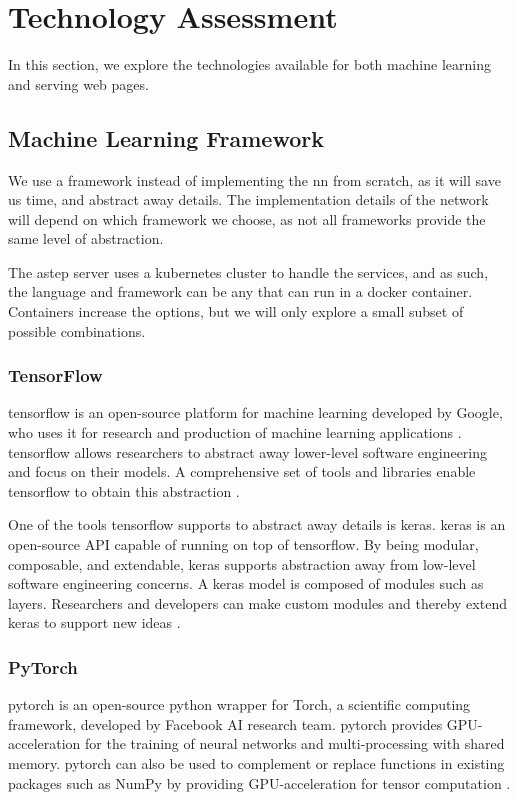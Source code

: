 \section{Technology Assessment} \label{sc:technology_assessment}
In this section, we explore the technologies available for both machine learning and serving web pages.

\subsection{Machine Learning Framework}
We use a framework instead of implementing the \gls{nn} from scratch, as it will save us time, and abstract away details. The implementation details of the network will depend on which framework we choose, as not all frameworks provide the same level of abstraction.

The \gls{astep} server uses a \gls{kubernetes} cluster to handle the services, and as such, the language and framework can be any that can run in a docker container. Containers increase the options, but we will only explore a small subset of possible combinations.

\subsubsection*{TensorFlow}
\gls{tensorflow} is an open-source platform for machine learning developed by Google, who uses it for research and production of machine learning applications \cite{GoogleTensorflowOpenSourced}. \Gls{tensorflow} allows researchers to abstract away lower-level software engineering and focus on their models. A comprehensive set of tools and libraries enable \gls{tensorflow} to obtain this abstraction \cite{TensorFlow}. 

One of the tools \gls{tensorflow} supports to abstract away details is \gls{keras}. \Gls{keras} is an open-source API capable of running on top of \gls{tensorflow}. By being modular, composable, and extendable, \gls{keras} supports abstraction away from low-level software engineering concerns. A \gls{keras} model is composed of modules such as layers. Researchers and developers can make custom modules and thereby extend \gls{keras} to support new ideas \cite{Keras}.

\subsubsection*{PyTorch}
\Gls{pytorch} is an open-source python wrapper for Torch, a scientific computing framework, developed by Facebook AI research team. \Gls{pytorch} provides GPU-acceleration for the training of neural networks and multi-processing with shared memory. \gls{pytorch} can also be used to complement or replace functions in existing packages such as NumPy by providing GPU-acceleration for tensor computation \cite{PyTorch2}.


